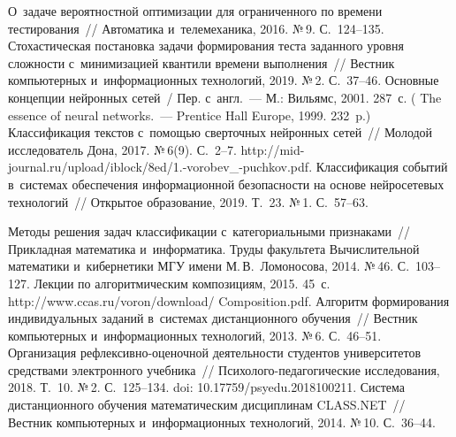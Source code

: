 \begin{multicols}{2}
{{\begin{thebibliography}{99}
 О~задаче вероятностной оптимизации для 
ограниченного по времени тестирования~// Автоматика и~телемеханика, 2016. №\,9. 
С.~124--135.
 Стохастическая постановка задачи 
формирования теста заданного уровня сложности с~минимизацией квантили времени 
выполнения~// Вестник компьютерных и~информационных технологий, 2019. №\,2.  
С.~37--46.
 Основные концепции нейронных сетей~/ Пер. с~англ.~--- М.: Вильямс, 
2001. 287~с. ( The essence of neural networks.~--- Prentice Hall Europe, 1999. 
232~p.)
 Классификация текстов с~помощью сверточных 
нейронных сетей~// Молодой исследователь Дона, 2017. №\,6(9). С.~2--7. 
{\sf 
http://mid-journal.ru/upload/iblock/8ed/1.-vorobev\_-puchkov.pdf}.
 Классификация событий в~системах 
обеспечения информационной безопасности на основе нейросетевых технологий~// 
Открытое образование, 2019. Т.~23. №\,1. С.~57--63.

 Методы решения задач классификации с~категориальными 
признаками~// Прикладная математика и~информатика. Труды факультета 
Вы\-чис\-ли\-тель\-ной математики и~кибернетики МГУ имени М.\,В.~Ломоносова, 2014. №\,46. 
С.~103--127.
 Лекции по алгоритмическим композициям, 2015. 45~с. {\sf 
http://www.ccas.ru/voron/download/ Composition.pdf}.
 Алгоритм формирования индивидуальных заданий 
в~сис\-те\-мах дистанционного обучения~// Вестник компьютерных и~информационных 
технологий, 2013. №\,6. С.~46--51.
 Организация реф\-лек\-сив\-но-оце\-ноч\-ной 
деятельности студентов университетов средствами электронного учебника~//  
Пси\-хо\-ло\-го-пе\-да\-го\-ги\-че\-ские исследования, 2018. Т.~10. №\,2. 
С.~125--134. doi:  10.17759/psyedu.2018100211.
 Система дистанционного 
обучения математическим дисциплинам CLASS.NET~// Вестник компьютерных 
и~информационных технологий, 2014. №\,10. С.~36--44. 
\end{thebibliography}

 }
 }

\end{multicols}

\vspace*{-6pt}

